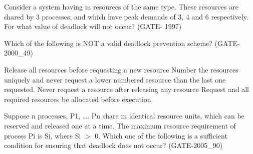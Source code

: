 \begin{questyle}

  \question  Consider a system having m resources of the same type. These resources are shared by 3 processes, and  which have peak demands of 3, 4 and 6 respectively.  For what value of deadlock will not occur? (GATE- 1997)

  \begin{oneparchoices}
  \end{oneparchoices}

  \end{questyle}




\begin{questyle}

  \question  Which of the following is NOT a valid deadlock prevention scheme? (GATE- 2000\_49)

  \begin{choices}
    \choice Release all resources before requesting a new resource
    \choice Number the resources uniquely and never request a lower numbered resource than the last one requested.
    \correctchoice Never request a resource after releasing any resource
    \choice Request and all required resources be allocated before execution.
  \end{choices}

  \end{questyle}




\begin{questyle}

  \question  Suppose n processes, P1, …. Pn share m identical resource units, which can be reserved and released one at a time. The maximum resource requirement of process Pi is Si, where Si \(>\) 0. Which one of the following is a sufficient condition for ensuring that deadlock does not occur? (GATE-2005\_90)

  \begin{choices}
  \end{choices}

  \end{questyle}



